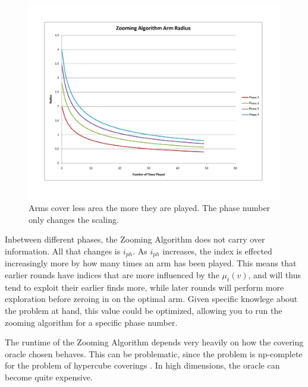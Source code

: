 \begin{figure}[!ht]
  \begin{center}
    \includegraphics[width=5 in]{figures/ZoomingRadius.png}
     \caption{Arms cover less area the more they are played. The phase number only changes the scaling.}
     \label{fig:zoomphase}
  \end{center}
\end{figure}

Inbetween different phases, the Zooming Algorithm does not carry
over information. All that changes is $i_{ph}$. As $i_{ph}$ increases,
the index is effected increasingly more by how many times an arm has
been played. This means that earlier rounds have indices that are more
influenced by the $\mu_t(v)$, and will thus tend to exploit their earlier
finds more, while later rounds will perform more exploration before zeroing
in on the optimal arm. Given specific knowlege about the problem at hand,
this value could be optimized, allowing you to run the zooming algorithm
for a specific phase number. 

The runtime of the Zooming Algorithm depends very heavily on how the
covering oracle chosen behaves. This can be problematic, since the problem
is np-complete for the problem of hypercube coverings  \cite{Hoffmann05acovering} . In high dimensions,
the oracle can become quite expensive.

